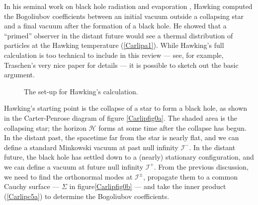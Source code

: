 \documentclass[12pt]{article}
\begin{document}
In his seminal work on black hole radiation and evaporation 
\cite{Hawking,Hawkingc}, Hawking computed the Bogoliubov 
coefficients between an initial vacuum outside a collapsing star 
and a final vacuum after the formation of a black hole.  He showed 
that a ``primed'' observer in the distant future would see a thermal 
distribution of particles at the Hawking temperature (\ref{Carlipa1}).  
While Hawking's full calculation is too technical to include
in this review --- see, for example, Traschen's very nice paper
\cite{Traschen} for details --- it is possible to sketch out the basic
argument.
\begin{figure}[ht]
\centerline{
\hspace*{30pt}
}
\caption{The set-up for Hawking's calculation.} \label{Carlipfig0}
\end{figure}

Hawking's starting point is the collapse of a star to form a black hole,
as shown in the Carter-Penrose diagram of figure \ref{Carlipfig0a}. The
shaded area is the collapsing star; the horizon $\mathcal{H}$ forms at
some time after the collapse has begun.  
In the distant past, the spacetime far from the star is nearly flat, and we
can define a standard Minkowski vacuum at past null infinity $\mathcal{I}^-$.
In the distant future, the black hole has settled down to a (nearly) stationary
configuration, and we can define a vacuum at future null infinity $\mathcal{I}^+$.
From the previous discussion, we need to find the orthonormal modes 
at $\mathcal{I}^\pm$, propagate them to a common Cauchy surface --- 
$\Sigma$ in figure\ref{Carlipfig0b} --- and take the inner product (\ref{Carlipc5a}) 
to determine the Bogoliubov coefficients.
\end{document}
